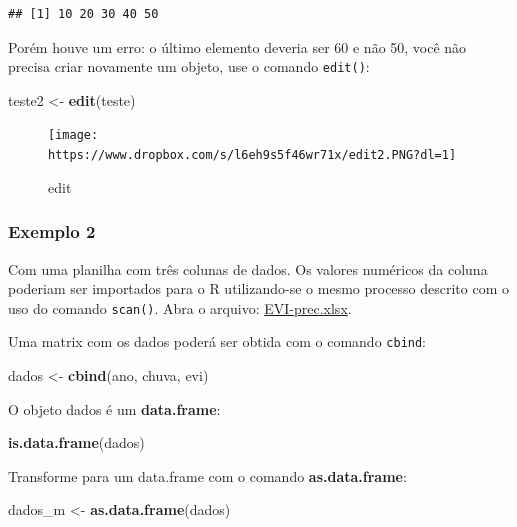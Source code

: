 \documentclass[
]{book}
\newenvironment{Shaded}{\begin{snugshade}}{\end{snugshade}}
\newcommand{\KeywordTok}[1]{\textcolor[rgb]{0.13,0.29,0.53}{\textbf{#1}}}
\newcommand{\NormalTok}[1]{#1}
\newcommand{\StringTok}[1]{\textcolor[rgb]{0.31,0.60,0.02}{#1}}
\begin{document}
\begin{verbatim}
## [1] 10 20 30 40 50
\end{verbatim}

Porém houve um erro: o último elemento deveria ser 60 e não 50, você não precisa criar novamente um objeto, use o comando \texttt{edit()}:

\begin{Shaded}
\begin{Highlighting}[]
\NormalTok{teste2 <-}\StringTok{ }\KeywordTok{edit}\NormalTok{(teste)}
\end{Highlighting}
\end{Shaded}

\begin{figure}
\centering
\texttt{[image: https://www.dropbox.com/s/l6eh9s5f46wr71x/edit2.PNG?dl=1]}
\caption{edit}
\end{figure}

\hypertarget{exemplo-2}{%
\subsubsection{Exemplo 2}\label{exemplo-2}}

Com uma planilha com três colunas de dados. Os valores numéricos da coluna poderiam ser importados para o R utilizando-se o mesmo processo descrito com o uso do comando \texttt{scan()}. Abra o arquivo: \href{https://www.dropbox.com/s/6504oo4olw34dw9/EVI_Prec.xlsx?dl=1}{EVI-prec.xlsx}.

Uma matrix com os dados poderá ser obtida com o comando \texttt{cbind}:

\begin{Shaded}
\begin{Highlighting}[]
\NormalTok{dados <-}\StringTok{ }\KeywordTok{cbind}\NormalTok{(ano, chuva, evi)}
\end{Highlighting}
\end{Shaded}

O objeto dados é um \textbf{data.frame}:

\begin{Shaded}
\begin{Highlighting}[]
\KeywordTok{is.data.frame}\NormalTok{(dados)}
\end{Highlighting}
\end{Shaded}

Transforme para um data.frame com o comando \textbf{as.data.frame}:

\begin{Shaded}
\begin{Highlighting}[]
\NormalTok{dados_m <-}\StringTok{ }\KeywordTok{as.data.frame}\NormalTok{(dados)}
\end{Highlighting}
\end{Shaded}
\end{document}
